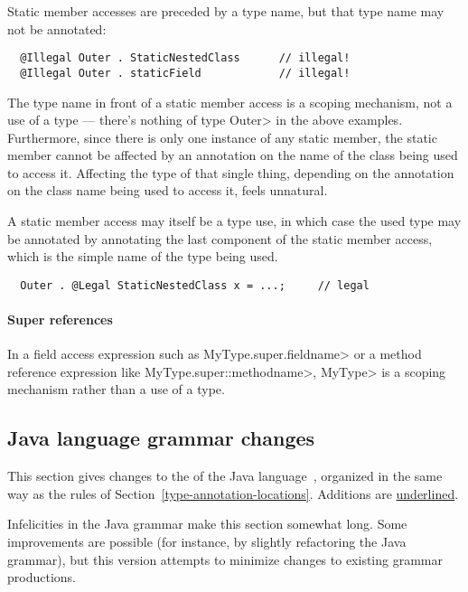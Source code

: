 \documentclass[10pt]{article}
\begin{document}
Static member accesses are preceded by a type name, but that type name may
not be annotated:

\preverbnegspace
\begin{Verbatim}
  @Illegal Outer . StaticNestedClass      // illegal!
  @Illegal Outer . staticField            // illegal!
\end{Verbatim}
\preverbnegspace

The type name in front of a static member access is a scoping mechanism,
not a use of a type --- there's nothing of type \<Outer> in the above
examples.  Furthermore, since there is only one instance of any static
member, the static member cannot be affected by an annotation on the name of
the class being used to access it.  Affecting the type of that single
thing, depending on the annotation on the class name being used to access
it, feels unnatural.

A static member access may itself be a type use, in which case the used
type may be annotated by annotating the last component of the static member
access, which is the simple name of the type being used.

\preverbnegspace
\begin{Verbatim}
  Outer . @Legal StaticNestedClass x = ...;     // legal
\end{Verbatim}
\preverbnegspace

\paragraph{Super references}

In a field access expression such as \<MyType.super.fieldname> or a method
reference expression like \<MyType.super::methodname>, \<MyType> is a
scoping mechanism rather than a use of a type.


\subsection{Java language grammar changes\label{grammar}}

This section
gives changes to the  of the Java
language~\cite[ch.~18]{GoslingJSBB2012}, organized in the same way as
the rules of Section~\ref{type-annotation-locations}.
Additions are \underline{underlined}.

Infelicities in the Java grammar make this section somewhat long.
Some improvements are
possible (for instance, by slightly refactoring the Java grammar), but this
version attempts to minimize changes to existing grammar productions.
\end{document}
